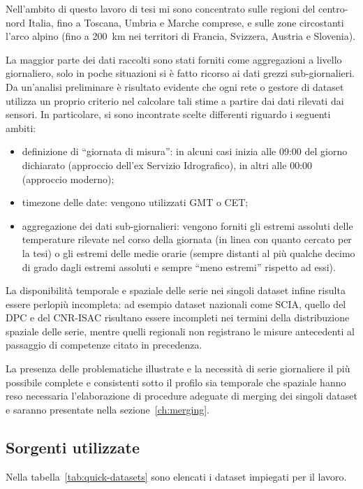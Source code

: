 Nell'ambito di questo lavoro di tesi mi sono concentrato sulle regioni del centro-nord Italia, fino a Toscana, Umbria e Marche comprese, e sulle zone circostanti l'arco alpino (fino a \qty{200}{\kilo\meter} nei territori di Francia, Svizzera, Austria e Slovenia).

La maggior parte dei dati raccolti sono stati forniti come aggregazioni a livello giornaliero, solo in poche situazioni si è fatto ricorso ai dati grezzi sub-giornalieri. Da un'analisi preliminare è risultato evidente che ogni rete o gestore di dataset utilizza un proprio criterio nel calcolare tali stime a partire dai dati rilevati dai sensori. In particolare, si sono incontrate scelte differenti riguardo i seguenti ambiti:

\begin{itemize}
  \item
    definizione di ``giornata di misura'': in alcuni casi inizia alle 09:00 del giorno dichiarato (approccio dell'ex Servizio Idrografico), in altri alle 00:00 (approccio moderno);
  \item
    timezone delle date: vengono utilizzati GMT o CET;
  \item
    aggregazione dei dati sub-giornalieri: vengono forniti gli estremi assoluti delle temperature rilevate nel corso della giornata (in linea con quanto cercato per la tesi) o gli estremi delle medie orarie (sempre distanti al più qualche decimo di grado dagli estremi assoluti e sempre ``meno estremi'' rispetto ad essi).
\end{itemize}

La disponibilità temporale e spaziale delle serie nei singoli dataset infine risulta essere perlopiù incompleta: ad esempio dataset nazionali come SCIA, quello del DPC e del CNR-ISAC risultano essere incompleti nei termini della distribuzione spaziale delle serie, mentre quelli regionali non registrano le misure antecedenti al passaggio di competenze citato in precedenza.

La presenza delle problematiche illustrate e la necessità di serie giornaliere il più possibile complete e consistenti sotto il profilo sia temporale che spaziale hanno reso necessaria l'elaborazione di procedure adeguate di merging dei singoli dataset e saranno presentate nella sezione~\ref{ch:merging}.

\subsection{Sorgenti utilizzate}\label{ch:sources}
Nella tabella~\ref{tab:quick-datasets} sono elencati i dataset impiegati per il lavoro.

